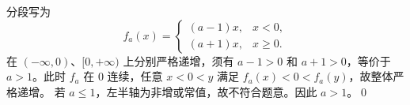 分段写为
\[
f_a(x)=\begin{cases}(a-1)x,&x<0,\\(a+1)x,&x\ge0.\end{cases}
\]
在 $(-\infty,0)$、$[0,+\infty)$ 上分别严格递增，须有 $a-1>0$ 和 $a+1>0$，等价于 $a>1$。此时 $f_a$ 在 $0$ 连续，任意 $x<0<y$ 满足 $f_a(x)<0<f_a(y)$，故整体严格递增。
若 $a\le1$，左半轴为非增或常值，故不符合题意。因此 $\boxed{a>1}$。\qed
